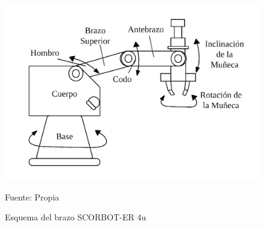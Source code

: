 \begin{figure}[H]
    \centering
    \includegraphics[scale = 0.5]{Imagenes/esquema_robot.png}
    \caption{Esquema del brazo SCORBOT-ER 4u}{Fuente: Propia}
\end{figure}